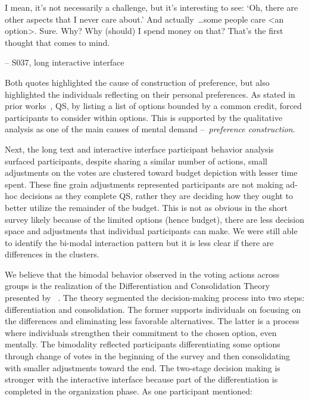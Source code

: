 \begin{displayquote}

I mean, it's not necessarily a challenge, but it's interesting to see: `Oh, there are other aspects that I never care about.' And actually~\ldots some people care <an option>. Sure. Why? Why (should) I spend money on that? That's the first thought that comes to mind.

\noindent \hfill -- S037, long interactive interface
\end{displayquote}

Both quotes highlighted the cause of construction of preference, but also highlighted the individuals reflecting on their personal preferences. As stated in prior works~\cite{chengCanShowWhat2021, naylor2017first}, QS, by listing a list of options bounded by a common credit, forced participants to consider within options. This is supported by the qualitative analysis as one of the main causes of mental demand --~\textit{preference construction}.

Next, the long text and interactive interface participant behavior analysis surfaced participants, despite sharing a similar number of actions, small adjustments on the votes are clustered toward budget depiction with lesser time spent. These fine grain adjustments represented participants are not making ad-hoc decisions as they complete QS, rather they are deciding how they ought to better utilize the remainder of the budget. This is not as obvious in the short survey likely because of the limited options (hence budget), there are less decision space and adjustments that individual participants can make. We were still able to identify the bi-modal interaction pattern but it is less clear if there are differences in the clusters.

We believe that the bimodal behavior observed in the voting actions across groups is the realization of the Differentiation and Consolidation Theory presented by ~\textcite{svensonDifferentiationConsolidationTheory1992}. The theory segmented the decision-making process into two steps: differentiation and consolidation. The former supports individuals on focusing on the differences and eliminating less favorable alternatives. The latter is a process where individuals strengthen their commitment to the chosen option, even mentally. The bimodality reflected participants differentiating some options through change of votes in the beginning of the survey and then consolidating with smaller adjustments toward the end. The two-stage decision making is stronger with the interactive interface because part of the differentiation is completed in the organization phase. As one participant mentioned:

